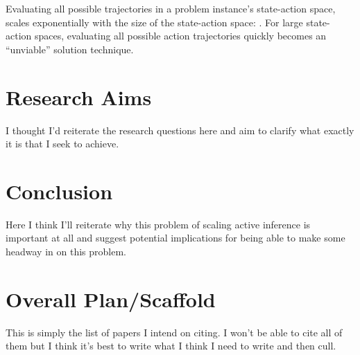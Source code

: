 \documentclass[onecolumn]{IEEEtran}
\begin{document}
Evaluating all possible trajectories in a problem instance's state-action space, scales exponentially with the size of the state-action space: \textcite{Applications-of-FEP-Machine-Learning-Neuroscience}. For large state-action spaces, evaluating all possible action trajectories quickly becomes an ``unviable'' solution technique.

\section{Research Aims}

I thought I'd reiterate the research questions here and aim to clarify what exactly it is that I seek to achieve.

\section{Conclusion}

Here I think I'll reiterate why this problem of scaling active inference is important at all and suggest potential implications for being able to make some headway in on this problem. 


\section{Overall Plan/Scaffold}

This is simply the list of papers I intend on citing. I won't be able to cite all of them but I think it's best to write what I think I need to write and then cull.
\end{document}
